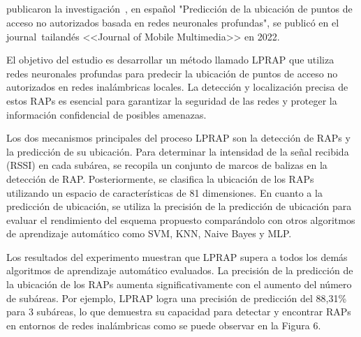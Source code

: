\subsection{}
\cite{pr_ketkhaw2019deepl}  publicaron la investigación , en español "Predicción de la ubicación de puntos de acceso no autorizados basada en redes neuronales profundas", se publicó en el journal tailandés <<Journal of Mobile Multimedia>> en 2022.

El objetivo del estudio es desarrollar un método llamado LPRAP que utiliza redes neuronales profundas para predecir la ubicación de puntos de acceso no autorizados en redes inalámbricas locales. La detección y localización precisa de estos RAPs es esencial para garantizar la seguridad de las redes y proteger la información confidencial de posibles amenazas.

Los dos mecanismos principales del proceso LPRAP son la detección de RAPs y la predicción de su ubicación. Para determinar la intensidad de la señal recibida (RSSI) en cada subárea, se recopila un conjunto de marcos de balizas en la detección de RAP. Posteriormente, se clasifica la ubicación de los RAPs utilizando un espacio de características de 81 dimensiones. En cuanto a la predicción de ubicación, se utiliza la precisión de la predicción de ubicación para evaluar el rendimiento del esquema propuesto comparándolo con otros algoritmos de aprendizaje automático como SVM, KNN, Naive Bayes y MLP.

Los resultados del experimento muestran que LPRAP supera a todos los demás algoritmos de aprendizaje automático evaluados. La precisión de la predicción de la ubicación de los RAPs aumenta significativamente con el aumento del número de subáreas. Por ejemplo, LPRAP logra una precisión de predicción del 88,31\% para 3 subáreas, lo que demuestra su capacidad para detectar y encontrar RAPs en entornos de redes inalámbricas como se puede observar en la Figura 6.

